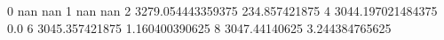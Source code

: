 0 nan nan
1 nan nan
2 3279.054443359375 234.857421875
4 3044.197021484375 0.0
6 3045.357421875 1.160400390625
8 3047.44140625 3.244384765625
